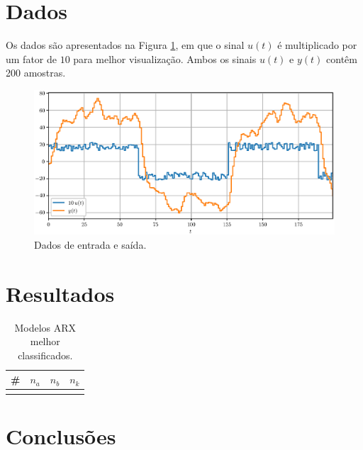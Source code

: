 \documentclass{ppgeesa}
\begin{document}
\section{Dados}

Os dados são apresentados na Figura \ref{fig:data}, em que o sinal $u(t)$ é multiplicado por um fator de $10$ para melhor visualização.
Ambos os sinais $u(t)$ e $y(t)$ contêm 200 amostras.

\begin{figure}[!htbp]
  \centering
  \includegraphics[width=\linewidth]{data}
  \caption{Dados de entrada e saída.}
  \label{fig:data}
\end{figure}

\section{Resultados}



\begin{table}[!htbp]
  \centering
  \caption{Modelos ARX melhor classificados.}
  \begin{tabular}{|c|c|c|c|}
    \hline
    \# & $n_a$ & $n_b$ & $n_k$ \\\hline\hline
    \\\hline
  \end{tabular}
  \label{tab:arx}
\end{table}
\section{Conclusões}



\end{document}
